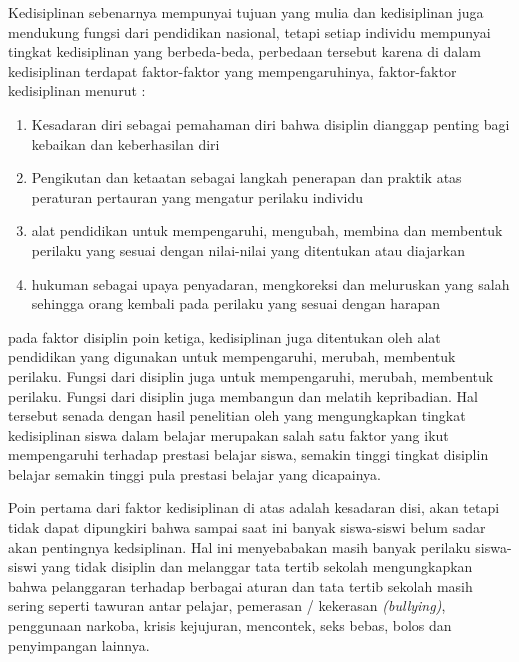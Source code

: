 \documentclass[f4paper,12pt, left=2.5cm,right=2cm,bottom=2cm, bahasa]{article}
\begin{document}
Kedisiplinan sebenarnya mempunyai tujuan yang mulia dan kedisiplinan juga mendukung fungsi dari pendidikan nasional, 
tetapi setiap individu mempunyai tingkat kedisiplinan yang berbeda-beda, perbedaan tersebut karena di dalam kedisiplinan terdapat faktor-faktor yang mempengaruhinya, faktor-faktor kedisiplinan menurut \cite{tu2004peran} :
\begin{enumerate}
  \item Kesadaran diri sebagai pemahaman diri bahwa disiplin dianggap penting bagi kebaikan dan keberhasilan diri
  \item Pengikutan dan ketaatan sebagai langkah penerapan dan praktik atas peraturan pertauran yang mengatur perilaku individu
  \item alat pendidikan untuk mempengaruhi, mengubah, membina dan membentuk perilaku yang sesuai dengan nilai-nilai yang ditentukan atau diajarkan
  \item hukuman sebagai upaya penyadaran, mengkoreksi dan meluruskan yang salah sehingga orang kembali pada perilaku yang sesuai dengan harapan 
\end{enumerate}

pada faktor disiplin poin ketiga, kedisiplinan juga ditentukan oleh alat pendidikan yang digunakan untuk mempengaruhi, merubah, membentuk perilaku. Fungsi dari disiplin juga untuk mempengaruhi, merubah, membentuk perilaku. Fungsi dari disiplin juga membangun dan melatih kepribadian. Hal tersebut senada dengan hasil penelitian oleh \cite{Sumantri_2010}  yang mengungkapkan tingkat kedisiplinan siswa dalam belajar merupakan salah satu faktor yang ikut mempengaruhi terhadap prestasi belajar siswa, semakin tinggi tingkat disiplin belajar semakin tinggi pula prestasi belajar yang dicapainya. 

Poin pertama dari faktor kedisiplinan di atas adalah kesadaran disi, akan tetapi tidak dapat dipungkiri bahwa sampai saat ini banyak siswa-siswi belum sadar akan pentingnya kedsiplinan. Hal ini menyebabakan masih banyak perilaku siswa-siswi yang tidak disiplin dan melanggar tata tertib sekolah \cite{Samani_Hariyanto} mengungkapkan bahwa pelanggaran terhadap berbagai aturan dan tata tertib sekolah masih sering seperti tawuran antar pelajar, pemerasan / kekerasan \textit{(bullying)}, penggunaan narkoba, krisis kejujuran, mencontek, seks bebas, bolos dan penyimpangan lainnya. 
\end{document}
